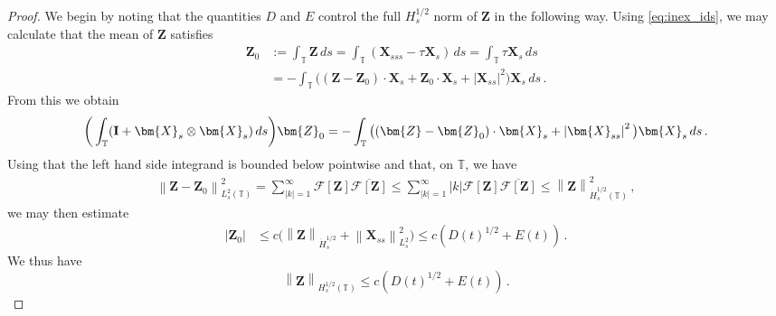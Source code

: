 \documentclass[11pt,reqno]{amsart}
\newcommand{\T}{\mathbb{T}}
\newcommand{\X}{\bm{X}}
\newcommand{\abs}[1]{\left\lvert #1 \right\rvert}
\newcommand{\norm}[1]{\left\lVert #1 \right\rVert}
\newcommand{\mc}[1]{\mathcal{#1}}
\numberwithin{equation}{section}
\theoremstyle{definition}
\begin{document}
\begin{proof}
We begin by noting that the quantities $D$ and $E$ control the full $H^{1/2}_s$ norm of $\bm{Z}$ in the following way. Using \eqref{eq:inex_ids}, we may calculate that the mean of $\bm{Z}$ satisfies
\begin{equation}
\begin{aligned}
  \bm{Z}_0 &:= \int_\T \bm{Z}\,ds = \int_\T (\X_{sss}-\tau\X_s)\,ds = \int_\T \tau\X_s\,ds \\
  &= -\int_\T \big((\bm{Z}-\bm{Z}_0)\cdot\X_s + \bm{Z}_0\cdot\X_s+\abs{\X_{ss}}^2\big)\X_s\,ds\,.
\end{aligned}
\end{equation}
From this we obtain 
\begin{equation}
  \bigg(\int_\T({\bf I}+ \X_s\otimes\X_s)\,ds\bigg) \bm{Z}_0 = -\int_\T \big((\bm{Z}-\bm{Z}_0)\cdot\X_s +\abs{\X_{ss}}^2\big)\X_s\,ds\,.
\end{equation}
Using that the left hand side integrand is bounded below pointwise and that, on $\T$, we have
\begin{align*}
  \norm{\bm{Z}-\bm{Z}_0}_{L^2_s(\T)}^2 = \sum_{\abs{k}=1}^\infty\mc{F}[{\bm Z}]\overline{\mc{F}[{\bm Z}]} \le \sum_{\abs{k}=1}^\infty\abs{k}\mc{F}[{\bm Z}]\overline{\mc{F}[{\bm Z}]}\le \norm{\bm{Z}}_{\dot H^{1/2}_s(\T)}^2\,,
\end{align*}
we may then estimate
\begin{equation}
\begin{aligned}
  \abs{\bm{Z}_0} &\le c\big(\norm{\bm{Z}}_{\dot H^{1/2}_s} + \norm{\X_{ss}}_{L^2_s}^2 \big) 
  \le c(D(t)^{1/2}+E(t))\,.
\end{aligned}
\end{equation}
We thus have
\begin{equation}\label{eq:Z_Hhalf}
  \norm{\bm{Z}}_{H^{1/2}_s(\T)} \le c(D(t)^{1/2}+E(t))\,.
\end{equation}



\end{proof}
\end{document}
